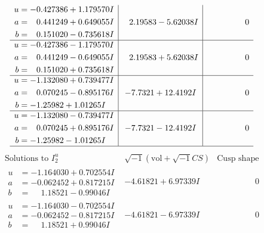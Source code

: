 \documentclass[1p]{elsarticle_modified}
\theoremstyle{definition}
\newcommand{\I}{\sqrt{-1}}
\begin{document}
$$\begin{array}{c|c|c}
\begin{aligned}
u &= -0.427386 + 1.179570 I \\
a &= \phantom{-}0.441249 + 0.649055 I \\
b &= \phantom{-}0.151020 - 0.735618 I\end{aligned}
 & \phantom{-}2.19583 - 5.62038 I & \phantom{-0.000000 } 0 \\ \hline\begin{aligned}
u &= -0.427386 - 1.179570 I \\
a &= \phantom{-}0.441249 - 0.649055 I \\
b &= \phantom{-}0.151020 + 0.735618 I\end{aligned}
 & \phantom{-}2.19583 + 5.62038 I & \phantom{-0.000000 } 0 \\ \hline\begin{aligned}
u &= -1.132080 + 0.739477 I \\
a &= \phantom{-}0.070245 - 0.895176 I \\
b &= -1.25982 + 1.01265 I\end{aligned}
 & -7.7321 + 12.4192 I & \phantom{-0.000000 } 0 \\ \hline\begin{aligned}
u &= -1.132080 - 0.739477 I \\
a &= \phantom{-}0.070245 + 0.895176 I \\
b &= -1.25982 - 1.01265 I\end{aligned}
 & -7.7321 - 12.4192 I & \phantom{-0.000000 } 0\\
 \hline 
 \end{array}$$\newpage$$\begin{array}{c|c|c}  
\text{Solutions to }I^u_{2}& \I (\text{vol} + \sqrt{-1}CS) & \text{Cusp shape}\\
 \hline 
\begin{aligned}
u &= -1.164030 + 0.702554 I \\
a &= -0.062452 + 0.817215 I \\
b &= \phantom{-}1.18521 - 0.99046 I\end{aligned}
 & -4.61821 + 6.97339 I & \phantom{-0.000000 } 0 \\ \hline\begin{aligned}
u &= -1.164030 - 0.702554 I \\
a &= -0.062452 - 0.817215 I \\
b &= \phantom{-}1.18521 + 0.99046 I\end{aligned}
 & -4.61821 - 6.97339 I & \phantom{-0.000000 } 0 \\ \hline\begin{aligned}

\end{aligned}
\end{array}$$
\end{document}
